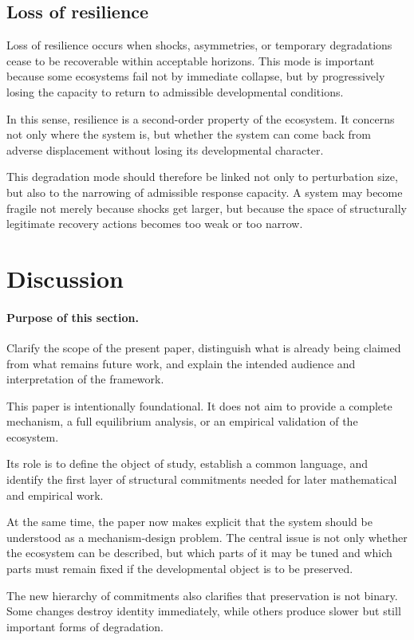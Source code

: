 \documentclass[11pt]{article}
\begin{document}
\subsection{Loss of resilience}

Loss of resilience occurs when shocks, asymmetries, or temporary degradations cease to be recoverable within acceptable horizons. This mode is important because some ecosystems fail not by immediate collapse, but by progressively losing the capacity to return to admissible developmental conditions.

In this sense, resilience is a second-order property of the ecosystem. It concerns not only where the system is, but whether the system can come back from adverse displacement without losing its developmental character.

This degradation mode should therefore be linked not only to perturbation size, but also to the narrowing of admissible response capacity. A system may become fragile not merely because shocks get larger, but because the space of structurally legitimate recovery actions becomes too weak or too narrow.

\section{Discussion}

\paragraph{Purpose of this section.}
Clarify the scope of the present paper, distinguish what is already being claimed from what remains future work, and explain the intended audience and interpretation of the framework.

This paper is intentionally foundational. It does not aim to provide a complete mechanism, a full equilibrium analysis, or an empirical validation of the ecosystem.

Its role is to define the object of study, establish a common language, and identify the first layer of structural commitments needed for later mathematical and empirical work.

At the same time, the paper now makes explicit that the system should be understood as a mechanism-design problem. The central issue is not only whether the ecosystem can be described, but which parts of it may be tuned and which parts must remain fixed if the developmental object is to be preserved.

The new hierarchy of commitments also clarifies that preservation is not binary. Some changes destroy identity immediately, while others produce slower but still important forms of degradation.
\end{document}
